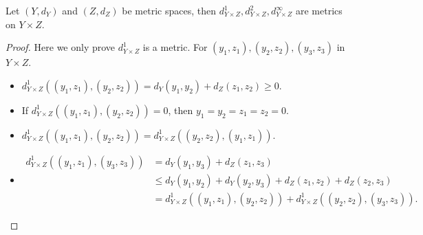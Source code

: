 \begin{proposition}
    Let \((Y, d_Y)\) and \((Z, d_Z)\) be metric spaces, then \(d_{Y \times Z}^1, d_{Y \times Z}^2, d_{Y \times Z}^{\infty} \) are metrics on \(Y \times Z\).     
\end{proposition}

\begin{proof}
    Here we only prove \(d_{Y \times Z}^1\) is a metric. For \((y_1, z_1), (y_2, z_2), (y_3, z_3)\) in \(Y \times Z\). 
    \begin{itemize}
        \item \(d_{Y \times Z}^1 \left( (y_1, z_1), (y_2, z_2) \right) = d_Y (y_1, y_2) + d_Z(z_1, z_2) \ge 0 \). 
        \item If \(d_{Y \times Z}^1 \left( (y_1, z_1), (y_2, z_2) \right) = 0 \), then \(y_1 = y_2 = z_1 = z_2 = 0\). 
        \item \(d_{Y \times Z}^1 \left( (y_1, z_1), (y_2, z_2) \right) = d_{Y \times Z}^1 \left( (y_2, z_2), (y_1, z_1) \right)  \). 
        \item  
        \begin{align*}
            d_{Y \times Z}^1 \left( (y_1, z_1), (y_3, z_3) \right) &= d_Y(y_1, y_3) + d_Z(z_1, z_3) \\
            &\le d_Y(y_1, y_2) + d_Y(y_2, y_3) + d_Z(z_1, z_2) + d_Z(z_2, z_3) \\
            &= d_{Y \times Z}^1 \left( (y_1, z_1), (y_2, z_2) \right) + d_{Y \times Z}^1 \left( (y_2, z_2), (y_3, z_3) \right).   
        \end{align*}
    \end{itemize}   
\end{proof}

